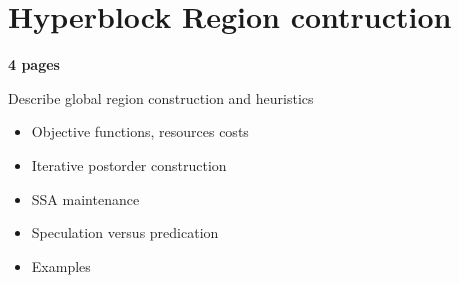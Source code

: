 \section{Hyperblock Region contruction}

\textbf{4 pages}

Describe global region construction and heuristics

    \begin{itemize}

    \item Objective functions, resources costs

    \item Iterative postorder construction

    \item SSA maintenance

    \item Speculation versus predication

    \item Examples

    \end{itemize}




